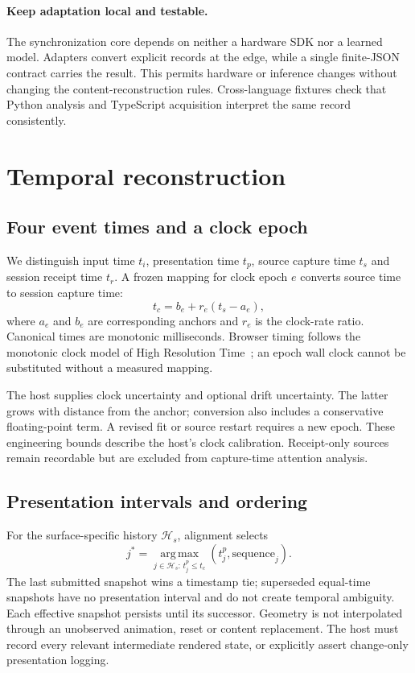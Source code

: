 \documentclass[sigconf,screen,nonacm]{acmart}
\begin{document}
\paragraph{Keep adaptation local and testable.}
The synchronization core depends on neither a hardware SDK nor a learned model.
Adapters convert explicit records at the edge, while a single finite-JSON
contract carries the result. This permits hardware or inference changes without
changing the content-reconstruction rules. Cross-language fixtures check that
Python analysis and TypeScript acquisition interpret the same record consistently.

\section{Temporal reconstruction}
\subsection{Four event times and a clock epoch}
We distinguish input time $t_i$, presentation time $t_p$, source capture time
$t_s$ and session receipt time $t_r$. A frozen mapping for clock epoch $e$ converts
source time to session capture time:
\begin{equation}
 t_c=b_e+r_e(t_s-a_e),
 \label{eq:clock}
\end{equation}
where $a_e$ and $b_e$ are corresponding anchors and $r_e$ is the clock-rate ratio.
Canonical times are monotonic milliseconds. Browser timing follows the monotonic
clock model of High Resolution Time~\cite{hrtime}; an epoch wall clock cannot be
substituted without a measured mapping.

The host supplies clock uncertainty and optional drift uncertainty. The latter
grows with distance from the anchor; conversion also includes a conservative
floating-point term. A revised fit or source restart requires a new epoch.
These engineering bounds describe the host's clock calibration. Receipt-only
sources remain recordable but are excluded from capture-time attention analysis.

\subsection{Presentation intervals and ordering}
For the surface-specific history $\mathcal H_s$, alignment selects
\begin{equation}
 j^*=\operatorname*{arg\,max}_{j\in\mathcal H_s:\,t^p_j\leq t_c}
       (t^p_j,\mathrm{sequence}_j).
 \label{eq:selection}
\end{equation}
The last submitted snapshot wins a timestamp tie; superseded equal-time
snapshots have no presentation interval and do not create temporal ambiguity.
Each effective snapshot persists until its successor. Geometry is not interpolated through an unobserved animation,
reset or content replacement. The host must record every relevant intermediate
rendered state, or explicitly assert change-only presentation logging.
\end{document}
